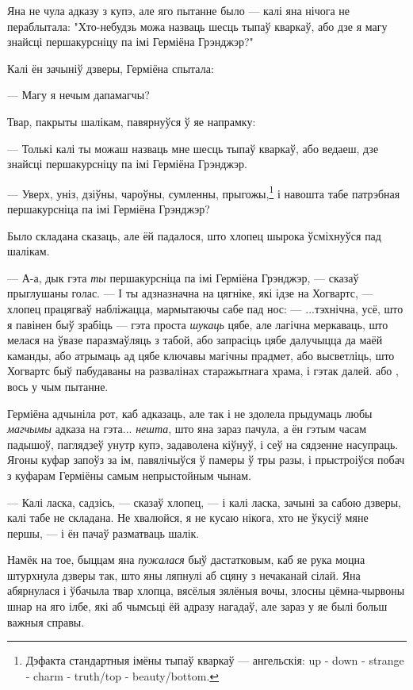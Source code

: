 Яна не чула адказу з купэ, але яго пытанне было --- калі яна
нічога не пераблытала: "Хто-небудзь
можа назваць шесць тыпаў кваркаў, або дзе я магу знайсці першакурсніцу па імі Герміёна Грэнджэр?"

Калі ён зачыніў дзверы, Герміёна спытала:

--- Магу я нечым дапамагчы?

Твар, пакрыты шалікам, павярнуўся ў яе напрамку:

--- Толькі калі ты можаш назваць мне шесць тыпаў кваркаў, або ведаеш, дзе знайсці
першакурсніцу па імі Герміёна Грэнджэр.


--- Уверх, уніз, дзіўны, чароўны, сумленны, прыгожы,\footnote{{} Дэфакта стандартныя
імёны тыпаў кваркаў --- ангельскія: up - down - strange - charm - truth/top - beauty/bottom.}
і навошта табе патрэбная першакурсніца па імі Герміёна Грэнджэр?

Было складана сказаць, але ёй падалося, што хлопец шырока ўсміхнуўся пад 
шалікам.

--- А-а, дык гэта  \emph{ты}  першакурсніца па імі Герміёна Грэнджэр, --- сказаў 
прыглушаны голас. --- І ты адзназначна на цягніке, які ідзе на Хогвартс, --- хлопец
працягваў набліжацца, мармытаючы сабе пад нос: --- ...тэхнічна, усё, што я павінен
быў зрабіць --- гэта проста \emph{шукаць} цябе, але лагічна меркаваць, што мелася на
ўвазе паразмаўляць з табой, або запрасіць цябе далучыцца да маёй каманды, або 
атрымаць ад цябе ключавы магічны прадмет, або высветліць, што Хогвартс быў 
пабудаваны на развалінах старажытнага храма, і гэтак далей.  або ,
вось у чым пытанне.

Герміёна адчыніла рот, каб адказаць, але так і не здолела прыдумаць любы \emph{магчымы}
адказа на гэта...  \emph{нешта}, што яна зараз пачула, а ён гэтым часам падышоў, паглядзеў 
унутр купэ, задаволена кіўнуў, і сеў на сядзенне насупраць. Ягоны куфар запоўз за ім, 
павялічыўся ў памеры ў тры разы, і прыстроіўся побач з куфарам Герміёны самым непрыстойным 
чынам.

--- Калі ласка, садзісь, --- сказаў хлопец, --- і калі ласка, зачыні за сабою дзверы,
калі табе не складана. Не хвалюйся, я не кусаю нікога, хто не ўкусіў мяне першы, ---
і ён пачаў разматваць шалік.

Намёк на тое, быццам яна \emph{пужалася} быў дастатковым, каб яе рука моцна штурхнула
дзверы так, што яны ляпнулі аб сцяну з нечаканай сілай. Яна абярнулася і ўбачыла 
твар хлопца, вясёлыя зялёныя вочы, злосны цёмна-чырвоны шнар на яго ілбе, які
аб чымсьці ёй адразу нагадаў, але зараз у яе былі больш важныя справы. 

